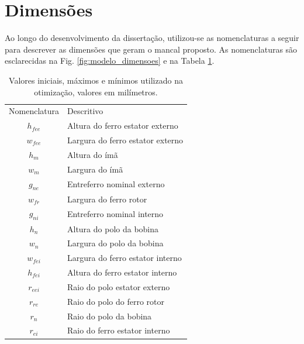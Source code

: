 
\section{Dimensões}

Ao longo do desenvolvimento da dissertação, utilizou-se as nomenclaturas a seguir para descrever as dimensões que geram o mancal proposto. As nomenclaturas são esclarecidas na Fig. \ref{fig:modelo_dimensoes} e na Tabela \ref{tab:modelo:dimensoes:nomenclatura}.

\begin{table}[ht!]
	\centering
	\begin{tabular}{c l}
		Nomenclatura & Descritivo \\
		$h_{fee}$	& Altura do ferro estator externo \\
		$w_{fee}$	& Largura do ferro estator externo\\
		
		$h_m$		& Altura do ímã \\
		$w_m$		& Largura do ímã \\

		$g_{ne}$	& Entreferro nominal externo \\
		
		$w_{fr}$	& Largura do ferro rotor \\
		
		$g_{ni}$	& Entreferro nominal interno \\
		
		$h_n$		& Altura do polo da bobina \\
		$w_n$		& Largura do polo da bobina \\
		
		$w_{fei}$	& Largura do ferro estator interno \\
		$h_{fei}$	& Altura do ferro estator interno \\

		$r_{eei}$	& Raio do polo estator externo \\				
		$r_{re}$	& Raio do polo do ferro rotor \\		
		$r_{n}$		& Raio do polo da bobina \\		
		$r_{ei}$	& Raio do ferro estator interno \\		
		
	\end{tabular} 
	\caption{Valores iniciais, máximos e mínimos utilizado na otimização, valores em milímetros.}
	\label{tab:modelo:dimensoes:nomenclatura}
\end{table}


